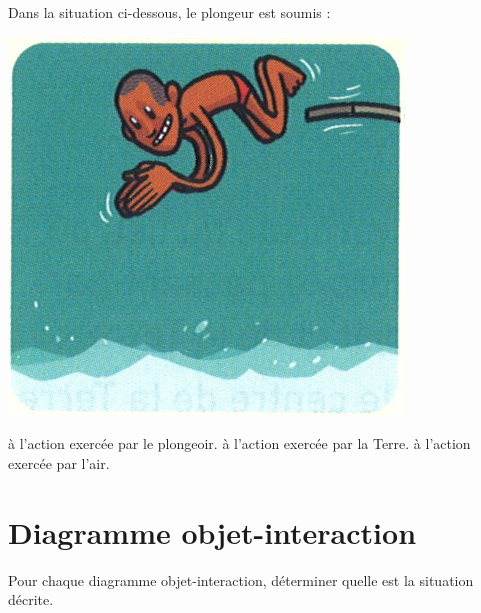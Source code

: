 \documentclass[a4paper,11pt]{exam}
\begin{document}
\begin{questions}
\begin{multicols}{2}
	\end{multicols}

	\question Dans la situation ci-dessous, le plongeur est soumis :
	
	\begin{multicols}{2}
		
		
		\begin{center}
			\includegraphics[scale=0.3]{plong}
		\end{center}
		\begin{checkboxes}
			\choice à l'action exercée par le plongeoir.
			\choice à l'action exercée par la Terre.
			\choice à l'action exercée par l'air.
		\end{checkboxes}
	\end{multicols}

\end{questions}


\section{Diagramme objet-interaction}

Pour chaque diagramme objet-interaction, déterminer quelle est la situation décrite.
\end{document}
